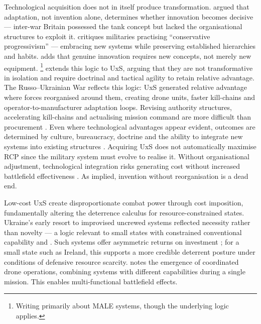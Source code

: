 Technological acquisition does not in itself produce transformation. \textcite{KREPINEVICH_1994} argued that adaptation, not invention alone, determines whether innovation becomes decisive --- inter-war Britain possessed the tank concept but lacked the organisational structures to exploit it. \textcite{BETTS_1996} critiques militaries practising ``conservative progressivism'' --- embracing new systems while preserving established hierarchies and habits. \textcite[7]{rosen_1991} adds that genuine innovation requires new concepts, not merely new equipment. \textcite[11]{Davis_2014}\footnote{Writing primarily about MALE systems, though the underlying logic applies.} extends this logic to UxS, arguing that they are not transformative in isolation and require doctrinal and tactical agility to retain relative advantage. The Russo--Ukrainian War reflects this logic: UxS generated relative advantage where forces reorganised around them, creating drone units, faster kill-chains and operator-to-manufacturer adaptation loops. Revising authority structures, accelerating kill-chains and actualising mission command are more difficult than procurement \parencite{COHEN_1996,KREPINEVICH_1994}. Even where technological advantages appear evident, outcomes are determined by culture, bureaucracy, doctrine and the ability to integrate new systems into existing structures \parencite{OWENS_2002,STIMSON_2015}. Acquiring UxS does not automatically maximise RCP since the military system must evolve to realise it. Without organisational adjustment, technological integration risks generating cost without increased battlefield effectiveness \parencite{SCHAUS_2018}. As \textcite{KREPINEVICH_1994} implied, invention without reorganisation is a dead end.





Low-cost UxS create disproportionate combat power through cost imposition, fundamentally altering the deterrence calculus for resource-constrained states. Ukraine’s early resort to improvised uncrewed systems reflected necessity rather than novelty --- a logic relevant to small states with constrained conventional capability \parencite[8]{kunertova_2024_2024_08} and \parencite[10]{MOLLOY_2024}. Such systems offer asymmetric returns on investment \parencite{stu_lyle_participant_11}; for a small state such as Ireland, this supports a more credible deterrent posture under conditions of defensive resource scarcity. \textcite[10]{MOLLOY_2024} notes the emergence of coordinated drone operations, combining systems with different capabilities during a single mission. This enables multi-functional battlefield effects.

